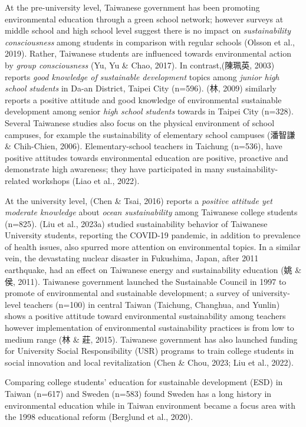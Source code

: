 \documentclass[
  letterpaper,
  DIV=11,
  numbers=noendperiod]{scrartcl}
\begin{document}
At the pre-university level, Taiwanese government has been promoting
environmental education through a green school network; however surveys
at middle school and high school level suggest there is no impact on
\emph{sustainability consciousness} among students in comparison with
regular schools (Olsson et al., 2019). Rather, Taiwanese students are
influenced towards environmental action by \emph{group consciousness}
(Yu, Yu \& Chao, 2017). In contrast,(陳珮英, 2003) reports \emph{good
knowledge of sustainable development} topics among \emph{junior high
school students} in Da-an District, Taipei City (n=596). (林, 2009)
similarly reports a positive attitude and good knowledge of
environmental sustainable development among senior \emph{high school
students} towards in Taipei City (n=328). Several Taiwanese studies also
focus on the physical environment of school campuses, for example the
sustainability of elementary school campuses (潘智謙 \& Chih-Chien,
2006). Elementary-school teachers in Taichung (n=536), have positive
attitudes towards environmental education are positive, proactive and
demonstrate high awareness; they have participated in many
sustainability-related workshops (Liao et al., 2022).

At the university level, (Chen \& Tsai, 2016) reports a \emph{positive
attitude yet moderate knowledge} about \emph{ocean sustainability} among
Taiwanese college students (n=825). (Liu et al., 2023a) studied
sustainability behavior of Taiwanese University students, reporting the
COVID-19 pandemic, in addition to prevalence of health issues, also
spurred more attention on environmental topics. In a similar vein, the
devastating nuclear disaster in Fukushima, Japan, after 2011 earthquake,
had an effect on Taiwanese energy and sustainability education (姚 \&
侯, 2011). Taiwanese government launched the Sustainable Council in 1997
to promote of environmental and sustainable development; a survey of
university-level teachers (n=100) in central Taiwan (Taichung, Changhua,
and Yunlin) shows a positive attitude toward environmental
sustainability among teachers however implementation of environmental
sustainability practices is from low to medium range (林 \& 莊, 2015).
Taiwanese government has also launched funding for University Social
Responsibility (USR) programs to train college students in social
innovation and local revitalization (Chen \& Chou, 2023; Liu et al.,
2022).

Comparing college students' education for sustainable development (ESD)
in Taiwan (n=617) and Sweden (n=583) found Sweden has a long history in
environmental education while in Taiwan environment became a focus area
with the 1998 educational reform (Berglund et al., 2020).
\end{document}
